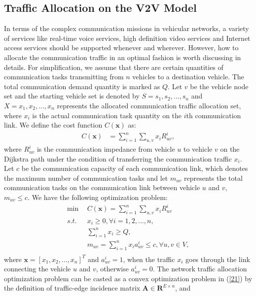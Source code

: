 \documentclass[journal,12pt,draftclsnofoot,onecolumn]{IEEEtran}
\begin{document}
\subsection{Traffic Allocation on the V2V Model}
\label{Traffic allocation on the V2V Model}
In terms of the complex communication missions in vehicular networks, a variety of services like real-time voice services, high definition video services and Internet access services should be supported whenever and wherever. However, how to allocate the communication traffic in an optimal fashion is worth discussing in details. For simplification, we assume that there are certain quantities of communication tasks transmitting from $n$ vehicles to a destination vehicle. The total communication demand quantity is marked as $Q$. Let $v$ be the vehicle node set and the starting vehicle set is denoted by $S={s_{1},s_{2},...,s_{n}}$ and $X={x_{1},x_{2},...,x_{n}}$ represents the allocated communication traffic allocation set, where $x_{i}$ is the actual communication task quantity on the $i$th communication link. We define the cost function $C(\mathbf{x})$ as:
\begin{equation}\label{199}
\begin{aligned}
   C(\mathbf{x})&=\sum\limits_{i=1}^{n}{\sum\limits_{u,v}{{{x}_{i}}R_{uv}^{i}}},
\end{aligned}
\end{equation}
where $R_{uv}^{i}$ is the communication impedance from vehicle $u$ to vehicle $v$ on the Dijkstra path under the condition of transferring the communication traffic $x_{i}$. Let $c$ be the communication capacity of each communication link, which denotes the maximum number of communication tasks and let $m_{uv}$ represents the total communication tasks on the communication link between vehicle $u$ and $v$, $m_{uv}\leq c$. We have the following optimization problem:
\begin{equation}\label{2001}
\begin{aligned}
 \min\ \ & C(\mathbf{x})=\sum\limits_{i=1}^{n}{\sum\limits_{u,v}{{{x}_{i}}R_{uv}^{i}}} \\
 s.t.\ \  & {{x}_{i}}\ge 0,\forall i=1,2,...,n, \\
     & \sum\limits_{i=1}^{n}{{{x}_{i}}\ge Q}, \\
     & {{m}_{uv}}=\sum\limits_{i=1}^{n}{{{x}_{i}}a_{uv}^{i}}\le c,\forall u,v\in V, \\
\end{aligned}
\end{equation}
where $\mathbf{x}={{[{{x}_{1}},{{x}_{2}},...,{{x}_{n}}]}^{T}}$ and $a_{uv}^{i}=1$, when the traffic $x_{i}$ goes through the link connecting the vehicle $u$ and $v$, otherwise $a_{uv}^{i}=0$. The network traffic allocation optimization problem can be casted as a convex optimization problem in (\ref{21}) by the definition of traffic-edge incidence matrix $\mathbf{A}\in \mathbf{R}^{E\times n}$, and
\end{document}
